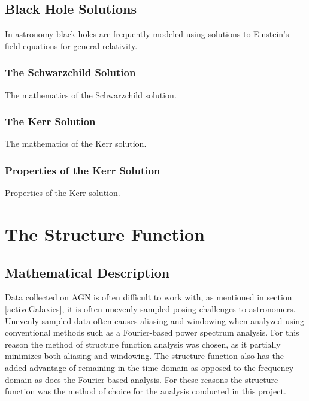 \documentclass[12pt, oneside]{smuthesis}
\begin{document}
\section{\sc Black Hole Solutions} \label{blackHoleSolutions}

In astronomy black holes are frequently modeled using solutions to Einstein's field equations for general relativity.

\subsection{\sc The Schwarzchild Solution} \label{schwarzchildSolution}

The mathematics of the Schwarzchild solution.

\subsection{\sc The Kerr Solution} \label{kerrSolution}

The mathematics of the Kerr solution.

\subsection{\sc Properties of the Kerr Solution} \label{kerrSolutionProperties}

Properties of the Kerr solution.



\chapter{\sc The Structure Function} \label{structureFunction}

\section{\sc Mathematical Description} \label{mathematicalDesc}

Data collected on AGN is often difficult to work with, as mentioned in section \ref{activeGalaxies}, it is often unevenly sampled posing challenges to astronomers. Unevenly sampled data often causes aliasing and windowing when analyzed using conventional methods such as a Fourier-based power spectrum analysis. For this reason the method of structure function analysis was chosen, as it partially minimizes both aliasing and windowing. The structure function also has the added advantage of remaining in the time domain as opposed to the frequency domain as does the Fourier-based analysis. For these reasons the structure function was the method of choice for the analysis conducted in this project.
\end{document}
